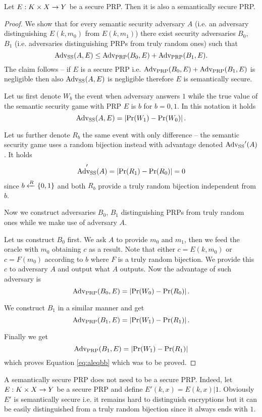\begin{thm}
	Let $E: K\times X\rightarrow Y$ be a secure PRP. Then it is also a semantically secure PRP.
\end{thm}
\begin{proof}
	We show that for every semantic security adversary $A$ (i.e. an adversary distinguishing $E(k,m_0)$ from $E(k,m_1)$) there exist security adversaries $B_0$, $B_1$ (i.e. adversaries distinguishing PRPs from truly random ones) such that
	\begin{equation}
	\label{eq:aleqbb}
		\operatorname*{Adv_{SS}}(A,E) \leq \operatorname*{Adv_{PRP}}(B_0,E) + \operatorname*{Adv_{PRP}}(B_1,E) .
	\end{equation}
	The claim follows -- if $E$ is a secure PRP i.e. $\operatorname*{Adv_{PRP}}(B_0,E) + \operatorname*{Adv_{PRP}}(B_1,E)$ is negligible then also $\operatorname*{Adv_{SS}}(A,E)$ is negligible therefore $E$ is semantically secure.
	
	Let us first denote $W_b$ the event when adversary answers $1$ while the true value of the semantic security game with PRP $E$ is $b$ for $b=0,1$. In this notation it holds
	\[
		\operatorname*{Adv_{SS}}(A,E) = \left| \Pr(W_1) - \Pr(W_0) \right| .
	\]
	
	Let us further denote $R_b$ the same event with only difference -- the semantic security game uses a random bijection instead with advantage denoted $\operatorname*{Adv_{SS}}'(A)$. It holds
	\[
		\operatorname*{Adv_{SS}}'(A) = \left| \Pr(R_1) - \Pr(R_0) \right| = 0
	\]
	since $b\xleftarrow{R}\{0,1\}$ and both $R_b$ provide a truly random bijection independent from $b$.
	
	Now we construct adversaries $B_0$, $B_1$ distinguishing PRPs from truly random ones while we make use of adversary $A$.
	
	Let us construct $B_0$ first. We ask $A$ to provide $m_0$ and $m_1$, then we feed the oracle with $m_0$ obtaining $c$ as a result. Note that either $c=E(k,m_0)$ or $c=F(m_0)$ according to $b$ where $F$ is a truly random bijection. We provide this $c$ to adversary $A$ and output what $A$ outputs. Now the advantage of such adversary is
	\[
		\operatorname*{Adv_{PRP}}(B_0,E) = \left| \Pr(W_0) - \Pr(R_0) \right| .
	\]
	
	We construct $B_1$ in a similar manner and get
	\[
		\operatorname*{Adv_{PRP}}(B_1,E) = \left| \Pr(W_1) - \Pr(R_1) \right| .
	\]
	
	Finally we get
	\[
		\operatorname*{Adv_{PRP}}(B_1,E) = \left| \Pr(W_1) - \Pr(R_1) \right|
	\]
	which proves Equation \ref{eq:aleqbb} which was to be proved.
\end{proof}

\begin{note}
	A semantically secure PRP does not need to be a secure PRP. Indeed, let $E: K\times X\rightarrow Y$ be a secure PRP and define $E'(k,x) = E(k,x)|1$. Obviously $E'$ is semantically secure i.e. it remains hard to distinguish encryptions but it can be easily distinguished from a truly random bijection since it always ends with $1$.
\end{note}

